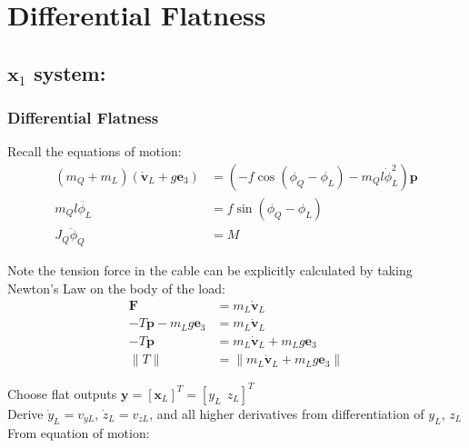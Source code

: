 \documentclass[11pt]{article}
\begin{document}
\newpage
\section{Differential Flatness} 
\subsection{$\mathbf{x}_1$ system:} 

\subsubsection{Differential Flatness}

Recall the equations of motion: 
\begin{align*}
(m_Q+m_L) (\dot{\mathbf{v}}_L + g \mathbf{e}_3) &= (-f \cos(\phi_Q - \phi_L) - m_Q l \dot{\phi}_L^2) \mathbf{p} \\
m_Q l \ddot{\phi_L} &= f \sin(\phi_Q - \phi_L) \\
J_Q \ddot{\phi}_Q &= M 
\end{align*}

Note the tension force in the cable can be explicitly calculated by taking Newton's Law on the body of the load:
\begin{align*}
\mathbf{F} &= m_L \mathbf{\dot{v}}_L \\
- T \mathbf{p} - m_L g \mathbf{e}_3 &= m_L \mathbf{\dot{v}}_L \\
- T \mathbf{p} &= m_L \mathbf{\dot{v}}_L + m_L g \mathbf{e}_3 \\
\| T \| &= \| m_L \mathbf{\dot{v}}_L + m_L g \mathbf{e}_3 \|
\end{align*}



Choose flat outputs $\mathbf{y} = [\mathbf{x}_L]^T = [ y_L \ \ z_L]^T$  \\

\mbox{} \newline
Derive $\dot{y}_L = v_{yL}$, $\dot{z}_L = v_{zL}$, and all higher derivatives from differentiation of $y_L$, $z_L$ \\

\mbox{} \newline
From equation of motion:
\end{document}
